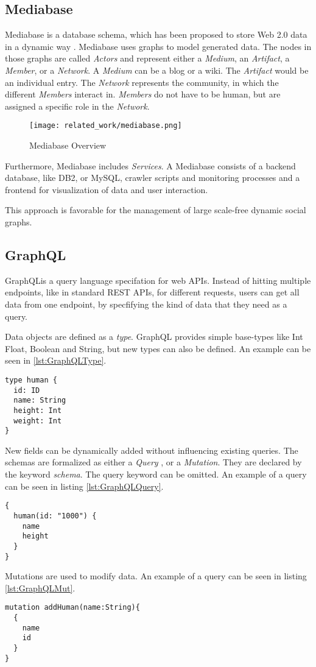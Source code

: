 \subsection{Mediabase}
Mediabase is a database schema, which has been proposed to store Web 2.0 data in a dynamic way \cite{KlPe08}. Mediabase uses graphs to model generated data. The nodes in those graphs are called \emph{Actors} and represent either a \emph{ Medium}, an \emph{Artifact}, a \emph{Member}, or a \emph{Network}. A \emph{ Medium} can be a blog or a wiki. The \emph{Artifact} would be an individual entry. The \emph{Network} represents the community, in which the different \emph{Members} interact in. \emph{Members} do not have to be human, but are assigned a specific role in the \emph{Network}.
\begin{figure}
	\centering
	\texttt{[image: related\_work/mediabase.png]}
	\caption{Mediabase Overview \cite{Klam10e}}
\end{figure}
Furthermore, Mediabase includes \emph{Services}. A Mediabase consists of a backend database, like DB2, or MySQL, crawler scripts and monitoring processes and a frontend for visualization of data  and user interaction.

This approach is favorable for the management of large scale-free dynamic social graphs.

\subsection{GraphQL}
GraphQL\footnotemark is a query language specifation for web APIs. Instead of hitting multiple endpoints, like in standard REST APIs, for different requests, users can get all data from one endpoint, by specfifying the kind of data that they need as a query.


Data objects are defined as a \emph{type}. GraphQL provides simple base-types like Int Float, Boolean and String, but new types can also be defined. An example can be seen in \ref{lst:GraphQLType}.
\begin{lstlisting}[caption={Example of a GraphQL schema},captionpos=b,label={lst:GraphQLType}]
type human {
  id: ID
  name: String
  height: Int
  weight: Int
}
\end{lstlisting}
New fields can be dynamically added without influencing existing queries. The schemas are formalized as either a \emph{Query }, or a \emph{Mutation}. They are declared by the keyword \emph{schema}. The query keyword can be omitted. An example of a query can be seen in listing \ref{lst:GraphQLQuery}.
\begin{lstlisting}[caption={Example of a GraphQL Query},captionpos=b,label={lst:GraphQLQuery}]
{
  human(id: "1000") {
    name
    height
  }
}
\end{lstlisting}
Mutations are used to modify data. An example of a query can be seen in listing \ref{lst:GraphQLMut}.
\begin{lstlisting}[caption={Example of a GraphQL Mutation},captionpos=b,label={lst:GraphQLMut}]
mutation addHuman(name:String){
  {
    name
    id
  }
}
\end{lstlisting}

